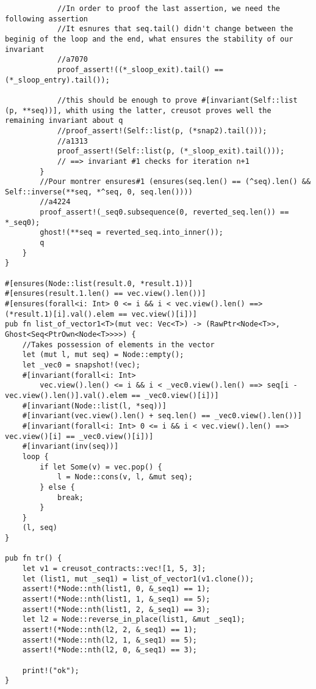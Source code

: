 \begin{verbatim}
            //In order to proof the last assertion, we need the following assertion
            //It esnures that seq.tail() didn't change between the beginig of the loop and the end, what ensures the stability of our invariant
            //a7070
            proof_assert!((*_sloop_exit).tail() == (*_sloop_entry).tail());

            //this should be enough to prove #[invariant(Self::list (p, **seq))], whith using the latter, creusot proves well the remaining invariant about q
            //proof_assert!(Self::list(p, (*snap2).tail()));
            //a1313
            proof_assert!(Self::list(p, (*_sloop_exit).tail()));
            // ==> invariant #1 checks for iteration n+1
        }
        //Pour montrer ensures#1 (ensures(seq.len() == (^seq).len() && Self::inverse(**seq, *^seq, 0, seq.len())))
        //a4224
        proof_assert!(_seq0.subsequence(0, reverted_seq.len()) == *_seq0);
        ghost!(**seq = reverted_seq.into_inner());
        q
    }
}

#[ensures(Node::list(result.0, *result.1))]
#[ensures(result.1.len() == vec.view().len())]
#[ensures(forall<i: Int> 0 <= i && i < vec.view().len() ==> (*result.1)[i].val().elem == vec.view()[i])]
pub fn list_of_vector1<T>(mut vec: Vec<T>) -> (RawPtr<Node<T>>, Ghost<Seq<PtrOwn<Node<T>>>>) {
    //Takes possession of elements in the vector
    let (mut l, mut seq) = Node::empty();
    let _vec0 = snapshot!(vec);
    #[invariant(forall<i: Int>
        vec.view().len() <= i && i < _vec0.view().len() ==> seq[i - vec.view().len()].val().elem == _vec0.view()[i])]
    #[invariant(Node::list(l, *seq))]
    #[invariant(vec.view().len() + seq.len() == _vec0.view().len())]
    #[invariant(forall<i: Int> 0 <= i && i < vec.view().len() ==> vec.view()[i] == _vec0.view()[i])]
    #[invariant(inv(seq))]
    loop {
        if let Some(v) = vec.pop() {
            l = Node::cons(v, l, &mut seq);
        } else {
            break;
        }
    }
    (l, seq)
}

pub fn tr() {
    let v1 = creusot_contracts::vec![1, 5, 3];
    let (list1, mut _seq1) = list_of_vector1(v1.clone());
    assert!(*Node::nth(list1, 0, &_seq1) == 1);
    assert!(*Node::nth(list1, 1, &_seq1) == 5);
    assert!(*Node::nth(list1, 2, &_seq1) == 3);
    let l2 = Node::reverse_in_place(list1, &mut _seq1);
    assert!(*Node::nth(l2, 2, &_seq1) == 1);
    assert!(*Node::nth(l2, 1, &_seq1) == 5);
    assert!(*Node::nth(l2, 0, &_seq1) == 3);

    print!("ok");
}

\end{verbatim}

\newpage
